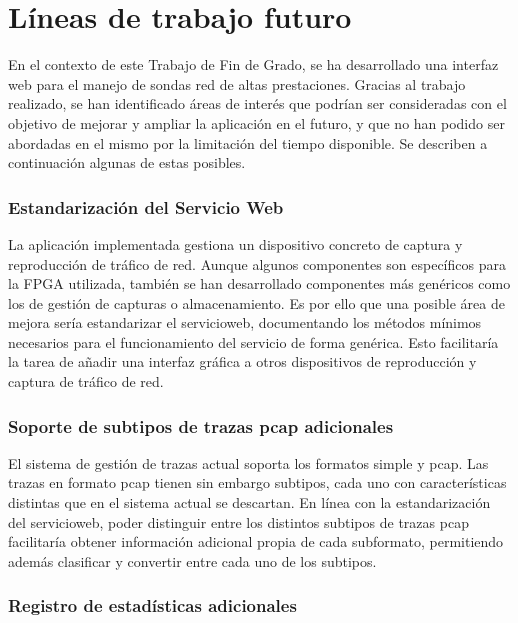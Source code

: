 \chapter{Líneas de trabajo futuro\label{cap:lineasDeTrabajoFuturo}}

En el contexto de este Trabajo de Fin de Grado, se ha desarrollado una interfaz web para el manejo de sondas red de altas prestaciones.
Gracias al trabajo realizado, se han identificado áreas de interés que podrían ser consideradas con el objetivo de mejorar y ampliar la aplicación en el futuro, y que no han podido ser abordadas en el mismo por la limitación del tiempo disponible.
Se describen a continuación algunas de estas posibles.

\subsection*{Estandarización del Servicio Web}

La aplicación implementada gestiona un dispositivo concreto de captura y reproducción de tráfico de red.
Aunque algunos componentes son específicos para la \gls{FPGA} utilizada, también se han desarrollado componentes más genéricos como los de gestión de capturas o almacenamiento.
Es por ello que una posible área de mejora sería estandarizar el \gls{servicioweb}, documentando los métodos mínimos necesarios para el funcionamiento del servicio de forma genérica.
Esto facilitaría la tarea de añadir una interfaz gráfica a otros dispositivos de reproducción y captura de tráfico de red.


\subsection*{Soporte de subtipos de trazas pcap adicionales}

El sistema de gestión de \glspl{traza} actual soporta los formatos \gls{simple} y \gls{pcap}.
Las \glspl{traza} en formato \gls{pcap} tienen sin embargo subtipos, cada uno con características distintas que en el sistema actual se descartan.
En línea con la estandarización del \gls{servicioweb}, poder distinguir entre los distintos subtipos de \glspl{traza} \gls{pcap} facilitaría obtener información adicional propia de cada subformato, permitiendo además clasificar y convertir entre cada uno de los subtipos.


\subsection*{Registro de estadísticas adicionales}

